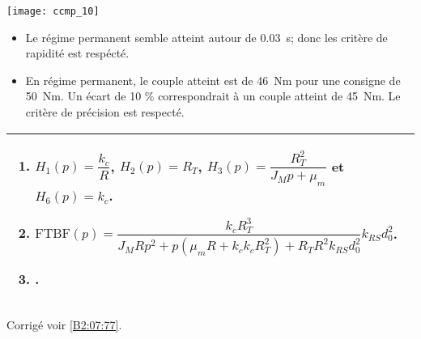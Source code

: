 \ifprof
\else
\begin{center}
\texttt{[image: ccmp\_10]}
\end{center}
\fi

\ifprof
\begin{corrige}
\begin{itemize}
\item Le régime permanent semble atteint autour de \SI{0,03}{s}; donc les critère de rapidité est respécté.
\item En régime permanent, le couple atteint est de \SI{46}{Nm} pour une consigne de \SI{50}{Nm}. Un écart de 10 \% correspondrait à un couple atteint de \SI{45}{Nm}. Le critère de précision est respecté.
\end{itemize}
\end{corrige}
\else
\fi




\ifprof
\else

\ifcolle
\else
\begin{tabular}{|p{.95\linewidth}|}
\hline
\begin{enumerate}
\item  $H_1(p)=\dfrac{k_c}{R}$, $H_2(p)=R_T$,  $H_3(p) = \dfrac{R_T^2}{J_M p  + \mu_m }$ et   $H_6(p)={k_c}$.
\item $\text{FTBF}(p)= \dfrac{k_c R_T^3}{J_MR p^2  + p\left(\mu_m R  +k_ck_c R_T^2\right)+R_TR^2k_{RS}d_0^2}k_{RS}d_0^2 $.
\item .
\end{enumerate} \\
\hline
\end{tabular}
\fi
\begin{flushright}
\footnotesize{Corrigé  voir \ref{B2:07:77}.}
\end{flushright}%
\fi